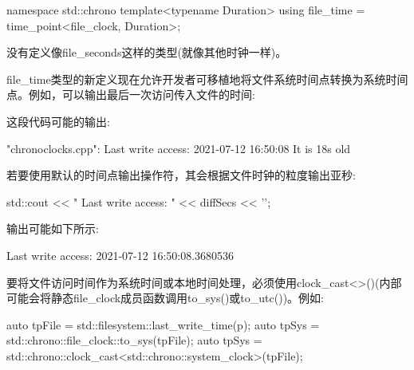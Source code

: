 \begin{cpp}
namespace std::chrono {
	template<typename Duration>
	using file_time = time_point<file_clock, Duration>;
}
\end{cpp}

没有定义像file\_seconds这样的类型(就像其他时钟一样)。

file\_time类型的新定义现在允许开发者可移植地将文件系统时间点转换为系统时间点。例如，可以输出最后一次访问传入文件的时间:


这段代码可能的输出:

\begin{shell}
"chronoclocks.cpp":
 Last write access: 2021-07-12 16:50:08
 It is 18s old
\end{shell}

若要使用默认的时间点输出操作符，其会根据文件时钟的粒度输出亚秒:

\begin{cpp}
std::cout << " Last write access: " << diffSecs << '\n';
\end{cpp}

输出可能如下所示:

\begin{shell}
Last write access: 2021-07-12 16:50:08.3680536
\end{shell}

要将文件访问时间作为系统时间或本地时间处理，必须使用clock\_cast<>()(内部可能会将静态file\_clock成员函数调用to\_sys()或to\_utc())。例如:

\begin{cpp}
auto tpFile = std::filesystem::last_write_time(p);
auto tpSys = std::chrono::file_clock::to_sys(tpFile);
auto tpSys = std::chrono::clock_cast<std::chrono::system_clock>(tpFile);
\end{cpp}












